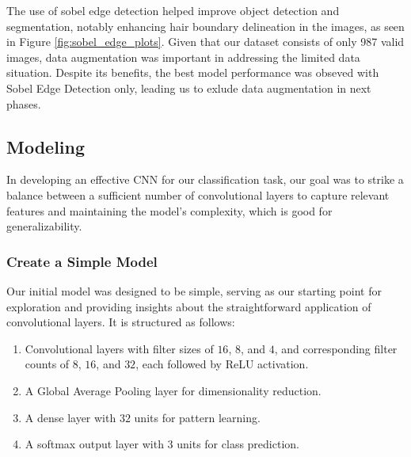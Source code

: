 The use of sobel edge detection helped improve object detection and segmentation, notably enhancing hair boundary delineation in the images, as seen in Figure \ref{fig:sobel_edge_plots}. Given that our dataset consists of only 987 valid images, data augmentation was important in addressing the limited data situation. Despite its benefits, the best model performance was obseved with Sobel Edge Detection only, leading us to exlude data augmentation in next phases.

\subsection{Modeling}

In developing an effective CNN for our classification task, our goal was to strike a balance between a sufficient number of convolutional layers to capture relevant features and maintaining the model's complexity, which is good for generalizability. 

\subsubsection{Create a Simple Model}

Our initial model was designed to be simple, serving as our starting point for exploration and providing insights about the straightforward application of convolutional layers. It is structured as follows:

\begin{enumerate}
  \item Convolutional layers with filter sizes of \(16\), \(8\), and \(4\), and corresponding filter counts of \(8\), \(16\), and \(32\), each followed by ReLU activation.
  \item A Global Average Pooling layer for dimensionality reduction.
  \item A dense layer with \(32\) units for pattern learning.
  \item A softmax output layer with \(3\) units for class prediction.
\end{enumerate}

